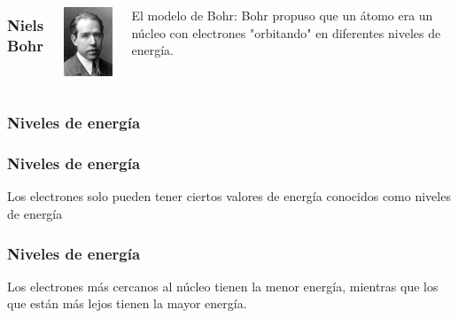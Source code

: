 \documentclass{beamer}
\begin{document}
\begin{frame}
    \begin{columns}
        \frametitle{Niels Bohr}
        \begin{column}{0.5\textwidth}
            \includegraphics[width=3cm]{../../../../public/images/chemists/Bohr.jpg}
        \end{column}
        \begin{column}{0.5\textwidth}
            El modelo de Bohr: Bohr propuso que un átomo era un núcleo con electrones "orbitando" en diferentes
            \pause \alert{niveles de energía}.
            \vspace{1cm}

        
        \end{column}
    \end{columns}
\end{frame}


\subsubsection{Niveles de energía}

\begin{frame}
    \frametitle{Niveles de energía}
    \onslide Los electrones solo pueden tener ciertos valores de energía conocidos como
    \pause \alert{niveles de energía}
\end{frame}

\begin{frame}
    \frametitle{Niveles de energía}
    \onslide Los electrones más cercanos al núcleo tienen la
    \pause \alert{menor}
    \onslide energía, mientras que los que están más lejos tienen la
    \pause\alert{mayor}
    \onslide energía.
    \vspace{.5cm}

    
\end{frame}
\end{document}
